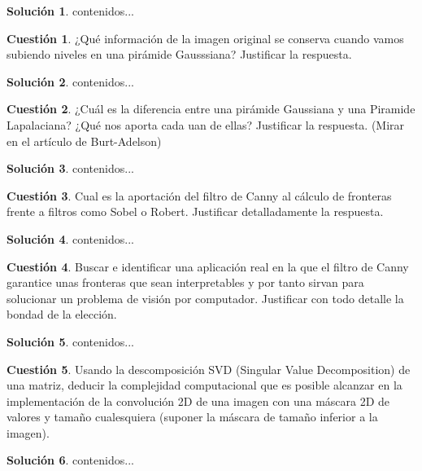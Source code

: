 \documentclass[a4paper, 11pt]{article}
\theoremstyle{definition}
\newtheorem{cuestion}{Cuestión}
\newtheorem*{solucion}{Solución}
\begin{document}
  \begin{solucion}
     	contenidos...
  \end{solucion}
  \begin{cuestion}
     	¿Qué información de la imagen original se conserva cuando vamos
      subiendo niveles en una pirámide Gausssiana? Justificar la respuesta.

  \end{cuestion}

  \begin{solucion}
     	contenidos...
  \end{solucion}
  \begin{cuestion}
     	¿Cuál es la diferencia entre una pirámide Gaussiana y una Piramide
      Lapalaciana? ¿Qué nos aporta cada uan de ellas? Justificar la respuesta. (Mirar en el artículo de Burt-Adelson)

  \end{cuestion}

  \begin{solucion}
     	contenidos...
  \end{solucion}
  \begin{cuestion}
     	Cual es la aportación del filtro de Canny al cálculo de fronteras
      frente a filtros como Sobel o Robert. Justificar detalladamente la
      respuesta.
  \end{cuestion}

  \begin{solucion}
     	contenidos...
  \end{solucion}
  \begin{cuestion}
     	Buscar e identificar una aplicación real en la que el filtro de
      Canny garantice unas fronteras que sean interpretables y por tanto sirvan para solucionar un problema de visión por computador. Justificar con todo detalle la bondad de la elección.

  \end{cuestion}

  \begin{solucion}
     	contenidos...
  \end{solucion}
  \begin{cuestion}
     	Usando la descomposición SVD (Singular Value
      Decomposition) de una matriz, deducir la complejidad computacional que es posible alcanzar en la implementación de la convolución 2D de una imagen con una máscara 2D de valores y tamaño cualesquiera (suponer la máscara de tamaño inferior a la imagen).

  \end{cuestion}

  \begin{solucion}
     	contenidos...
  \end{solucion}
\end{document}
